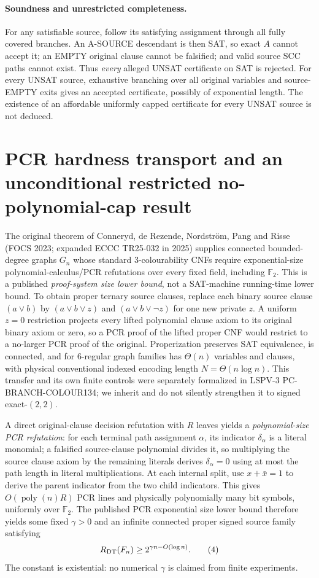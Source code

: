 \documentclass[11pt]{article}
\begin{document}
\paragraph{Soundness and unrestricted completeness.} For any satisfiable source, follow its satisfying assignment through all fully covered branches. An A-SOURCE descendant is then SAT, so exact $A$ cannot accept it; an EMPTY original clause cannot be falsified; and valid source SCC paths cannot exist. Thus \emph{every} alleged UNSAT certificate on SAT is rejected. For every UNSAT source, exhaustive branching over all original variables and source-EMPTY exits gives an accepted certificate, possibly of exponential length. The existence of an affordable uniformly capped certificate for every UNSAT source is not deduced.

\section{PCR hardness transport and an unconditional restricted no-polynomial-cap result}
The original theorem of Conneryd, de Rezende, Nordstr\"om, Pang and Risse (FOCS 2023; expanded ECCC TR25-032 in 2025) supplies connected bounded-degree graphs $G_n$ whose standard 3-colourability CNFs require exponential-size polynomial-calculus/PCR refutations over every fixed field, including $\mathbb F_2$. This is a published \emph{proof-system size lower bound}, not a SAT-machine running-time lower bound. To obtain proper ternary source clauses, replace each binary source clause $(a\vee b)$ by $(a\vee b\vee z)$ and $(a\vee b\vee\neg z)$ for one new private $z$. A uniform $z=0$ restriction projects every lifted polynomial clause axiom to its original binary axiom or zero, so a PCR proof of the lifted proper CNF would restrict to a no-larger PCR proof of the original. Properization preserves SAT equivalence, is connected, and for 6-regular graph families has $\Theta(n)$ variables and clauses, with physical conventional indexed encoding length $N=\Theta(n\log n)$. This transfer and its own finite controls were separately formalized in LSPV-3 PC-BRANCH-COLOUR134; we inherit and do not silently strengthen it to signed exact-$(2,2)$.

A direct original-clause decision refutation with $R$ leaves yields a \emph{polynomial-size PCR refutation}: for each terminal path assignment $\alpha$, its indicator $\delta_\alpha$ is a literal monomial; a falsified source-clause polynomial divides it, so multiplying the source clause axiom by the remaining literals derives $\delta_\alpha=0$ using at most the path length in literal multiplications. At each internal split, use $x+\bar x=1$ to derive the parent indicator from the two child indicators. This gives $O(\operatorname{poly}(n)R)$ PCR lines and physically polynomially many bit symbols, uniformly over $\mathbb F_2$. The published PCR exponential size lower bound therefore yields some fixed $\gamma>0$ and an infinite connected proper signed source family satisfying
\[
                R_{\rm DT}(F_n)\ge2^{\gamma n-O(\log n)}.
\tag{4}
\]
The constant is existential: no numerical $\gamma$ is claimed from finite experiments.
\end{document}

